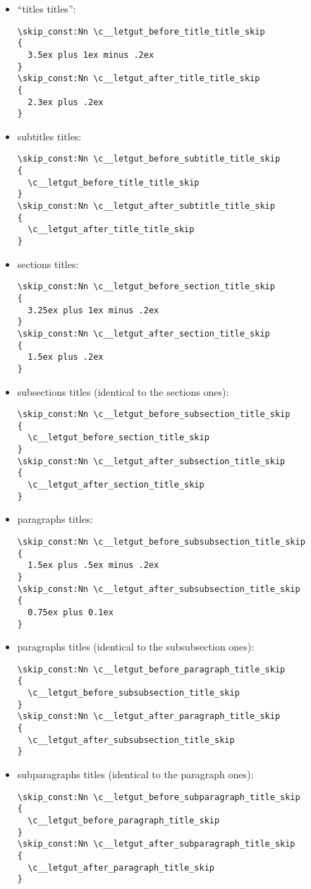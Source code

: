 \documentclass{letgut}
\begin{document}
\begin{itemize}
\item “titles titles”:
\begin{lstlisting}
\skip_const:Nn \c__letgut_before_title_title_skip
{
  3.5ex plus 1ex minus .2ex
}
\skip_const:Nn \c__letgut_after_title_title_skip
{
  2.3ex plus .2ex
}
\end{lstlisting}
\item subtitles titles:
\begin{lstlisting}
\skip_const:Nn \c__letgut_before_subtitle_title_skip
{
  \c__letgut_before_title_title_skip
}
\skip_const:Nn \c__letgut_after_subtitle_title_skip
{
  \c__letgut_after_title_title_skip
}
\end{lstlisting}
\item sections titles:
\begin{lstlisting}
\skip_const:Nn \c__letgut_before_section_title_skip
{
  3.25ex plus 1ex minus .2ex
}
\skip_const:Nn \c__letgut_after_section_title_skip
{
  1.5ex plus .2ex
}
\end{lstlisting}
\item subsections titles (identical to the sections ones):
\begin{lstlisting}
\skip_const:Nn \c__letgut_before_subsection_title_skip
{
  \c__letgut_before_section_title_skip
}
\skip_const:Nn \c__letgut_after_subsection_title_skip
{
  \c__letgut_after_section_title_skip
}
\end{lstlisting}
\item paragraphs titles:
\begin{lstlisting}
\skip_const:Nn \c__letgut_before_subsubsection_title_skip
{
  1.5ex plus .5ex minus .2ex
}
\skip_const:Nn \c__letgut_after_subsubsection_title_skip
{
  0.75ex plus 0.1ex
}
\end{lstlisting}
\item paragraphs titles (identical to the subsubsection ones):
\begin{lstlisting}
\skip_const:Nn \c__letgut_before_paragraph_title_skip
{
  \c__letgut_before_subsubsection_title_skip
}
\skip_const:Nn \c__letgut_after_paragraph_title_skip
{
  \c__letgut_after_subsubsection_title_skip
}
\end{lstlisting}
\item subparagraphs titles (identical to the paragraph ones):
\begin{lstlisting}
\skip_const:Nn \c__letgut_before_subparagraph_title_skip
{
  \c__letgut_before_paragraph_title_skip
}
\skip_const:Nn \c__letgut_after_subparagraph_title_skip
{
  \c__letgut_after_paragraph_title_skip
}
\end{lstlisting}
\end{itemize}
\end{document}
